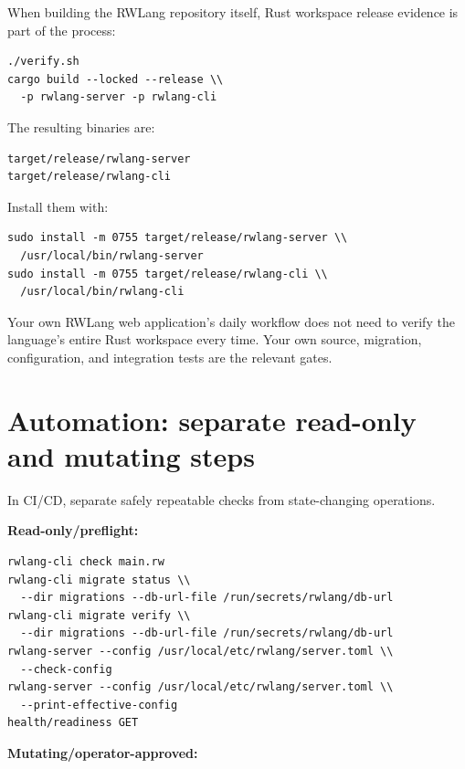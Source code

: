 When building the RWLang repository itself, Rust workspace release evidence is part of the process:

\begin{lstlisting}
./verify.sh
cargo build --locked --release \\
  -p rwlang-server -p rwlang-cli
\end{lstlisting}

The resulting binaries are:

\begin{lstlisting}
target/release/rwlang-server
target/release/rwlang-cli
\end{lstlisting}

Install them with:

\begin{lstlisting}
sudo install -m 0755 target/release/rwlang-server \\
  /usr/local/bin/rwlang-server
sudo install -m 0755 target/release/rwlang-cli \\
  /usr/local/bin/rwlang-cli
\end{lstlisting}

Your own RWLang web application's daily workflow does not need to verify the language's entire Rust workspace every time. Your own source, migration, configuration, and integration tests are the relevant gates.

\section{Automation: separate read-only and mutating steps}

In CI/CD, separate safely repeatable checks from state-changing operations.

\textbf{Read-only/preflight:}

\begin{lstlisting}
rwlang-cli check main.rw
rwlang-cli migrate status \\
  --dir migrations --db-url-file /run/secrets/rwlang/db-url
rwlang-cli migrate verify \\
  --dir migrations --db-url-file /run/secrets/rwlang/db-url
rwlang-server --config /usr/local/etc/rwlang/server.toml \\
  --check-config
rwlang-server --config /usr/local/etc/rwlang/server.toml \\
  --print-effective-config
health/readiness GET
\end{lstlisting}

\textbf{Mutating/operator-approved:}

